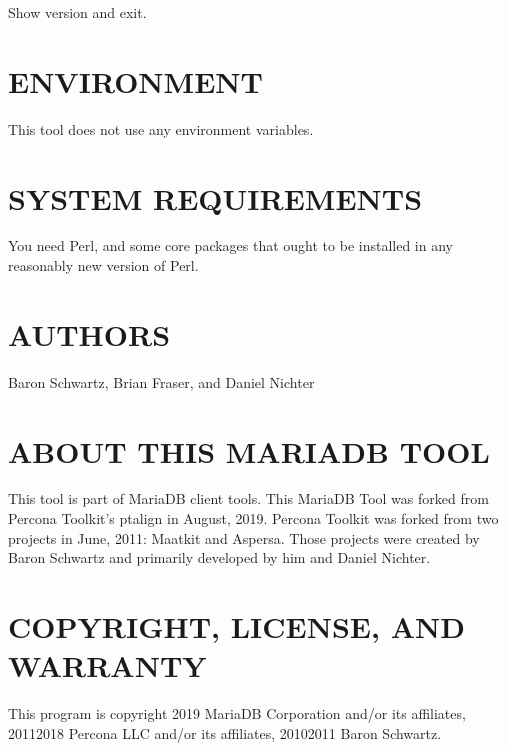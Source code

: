 \documentclass[letterpaper,10pt,english]{sphinxmanual}
\begin{document}
\begin{fulllineitems}
\label{\detokenize{mariadb-align-output:cmdoption-mariadb-align-output-version}}
\sphinxAtStartPar
Show version and exit.

\end{fulllineitems}



\section{ENVIRONMENT}
\label{\detokenize{mariadb-align-output:environment}}
\sphinxAtStartPar
This tool does not use any environment variables.


\section{SYSTEM REQUIREMENTS}
\label{\detokenize{mariadb-align-output:system-requirements}}
\sphinxAtStartPar
You need Perl, and some core packages that ought to be installed in any
reasonably new version of Perl.


\section{AUTHORS}
\label{\detokenize{mariadb-align-output:authors}}
\sphinxAtStartPar
Baron Schwartz, Brian Fraser, and Daniel Nichter


\section{ABOUT THIS MARIADB TOOL}
\label{\detokenize{mariadb-align-output:about-this-mariadb-tool}}
\sphinxAtStartPar
This tool is part of MariaDB client tools. This MariaDB Tool was forked from
Percona Toolkit’s pt\sphinxhyphen{}align in August, 2019. Percona Toolkit was forked from two
projects in June, 2011: Maatkit and Aspersa.  Those projects were created by
Baron Schwartz and primarily developed by him and Daniel Nichter.


\section{COPYRIGHT, LICENSE, AND WARRANTY}
\label{\detokenize{mariadb-align-output:copyright-license-and-warranty}}
\sphinxAtStartPar
This program is copyright 2019 MariaDB Corporation and/or its affiliates,
2011\sphinxhyphen{}2018 Percona LLC and/or its affiliates, 2010\sphinxhyphen{}2011 Baron Schwartz.
\end{document}
